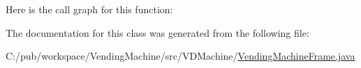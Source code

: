 Here is the call graph for this function\+:




The documentation for this class was generated from the following file\+:\begin{DoxyCompactItemize}
\item 
C\+:/pub/workspace/\+Vending\+Machine/src/\+V\+D\+Machine/\hyperlink{_vending_machine_frame_8java}{Vending\+Machine\+Frame.\+java}\end{DoxyCompactItemize}
